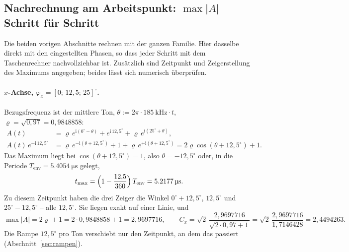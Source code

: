 \documentclass[11pt,a4paper]{article}
\newcommand{\crest}{\ensuremath{C}}
\begin{document}
\subsection{Nachrechnung am Arbeitspunkt: \boldmath$\max|A|$ Schritt für Schritt}
\label{sec:handcalc}

Die beiden vorigen Abschnitte rechnen mit der ganzen Familie. Hier dasselbe
direkt mit den eingestellten Phasen, so dass jeder Schritt mit dem
Taschenrechner nachvollziehbar ist. Zusätzlich sind Zeitpunkt und
Zeigerstellung des Maximums angegeben; beides lässt sich numerisch
überprüfen.

\paragraph{\boldmath$x$-Achse, $\varphi_x=[0;\,12{,}5;\,25]^\circ$.}
Bezugsfrequenz ist der mittlere Ton, $\theta := 2\pi\cdot\SI{185}{\kilo\hertz}\cdot t$,
$\varrho=\sqrt{0{,}97}=0{,}9848858$:
\begin{align}
  A(t) &= \varrho\,e^{\mathrm{i}(0^\circ-\theta)} + e^{\mathrm{i}\,12{,}5^\circ}
          + \varrho\,e^{\mathrm{i}(25^\circ+\theta)} ,\\
  A(t)\,e^{-\mathrm{i}\,12{,}5^\circ}
       &= \varrho\,e^{-\mathrm{i}(\theta+12{,}5^\circ)} + 1
          + \varrho\,e^{+\mathrm{i}(\theta+12{,}5^\circ)}
        = 2\varrho\cos(\theta+12{,}5^\circ) + 1 .
\end{align}
Das Maximum liegt bei $\cos(\theta+12{,}5^\circ)=1$, also $\theta=-12{,}5^\circ$
oder, in die Periode $T_\mathrm{env}=\SI{5.4054}{\micro\second}$ gelegt,
\begin{equation}
  t_\mathrm{max} = \Bigl(1-\frac{12{,}5}{360}\Bigr)\,T_\mathrm{env} = \SI{5.2177}{\micro\second} .
\end{equation}
Zu diesem Zeitpunkt haben die drei Zeiger die Winkel
$0^\circ+12{,}5^\circ$, $12{,}5^\circ$ und $25^\circ-12{,}5^\circ$ -- alle
$12{,}5^\circ$. Sie liegen exakt auf einer Linie, und
\begin{equation}
  \max|A| = 2\varrho+1 = 2\cdot0{,}9848858+1 = 2{,}9697716,
  \qquad
  \crest_x = \sqrt2\,\frac{2{,}9697716}{\sqrt{2\cdot0{,}97+1}}
           = \sqrt2\,\frac{2{,}9697716}{1{,}7146428} = 2{,}4494263 .
\end{equation}
Die Rampe $12{,}5^\circ$ pro Ton verschiebt nur den Zeitpunkt, an dem das
passiert (Abschnitt~\ref{sec:rampen}).
\end{document}
